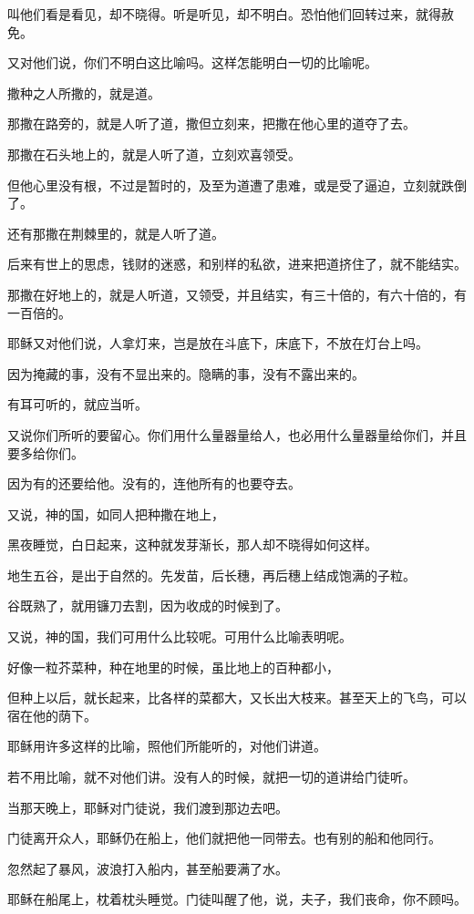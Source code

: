 \documentclass[12pt,oneside]{book}
\begin{document}
叫他们看是看见，却不晓得。听是听见，却不明白。恐怕他们回转过来，就得赦免。

又对他们说，你们不明白这比喻吗。这样怎能明白一切的比喻呢。

撒种之人所撒的，就是道。

那撒在路旁的，就是人听了道，撒但立刻来，把撒在他心里的道夺了去。

那撒在石头地上的，就是人听了道，立刻欢喜领受。

但他心里没有根，不过是暂时的，及至为道遭了患难，或是受了逼迫，立刻就跌倒了。

还有那撒在荆棘里的，就是人听了道。

后来有世上的思虑，钱财的迷惑，和别样的私欲，进来把道挤住了，就不能结实。

那撒在好地上的，就是人听道，又领受，并且结实，有三十倍的，有六十倍的，有一百倍的。

耶稣又对他们说，人拿灯来，岂是放在斗底下，床底下，不放在灯台上吗。

因为掩藏的事，没有不显出来的。隐瞒的事，没有不露出来的。

有耳可听的，就应当听。

又说你们所听的要留心。你们用什么量器量给人，也必用什么量器量给你们，并且要多给你们。

因为有的还要给他。没有的，连他所有的也要夺去。

又说，神的国，如同人把种撒在地上，

黑夜睡觉，白日起来，这种就发芽渐长，那人却不晓得如何这样。

地生五谷，是出于自然的。先发苗，后长穗，再后穗上结成饱满的子粒。

谷既熟了，就用镰刀去割，因为收成的时候到了。

又说，神的国，我们可用什么比较呢。可用什么比喻表明呢。

好像一粒芥菜种，种在地里的时候，虽比地上的百种都小，

但种上以后，就长起来，比各样的菜都大，又长出大枝来。甚至天上的飞鸟，可以宿在他的荫下。

耶稣用许多这样的比喻，照他们所能听的，对他们讲道。

若不用比喻，就不对他们讲。没有人的时候，就把一切的道讲给门徒听。

当那天晚上，耶稣对门徒说，我们渡到那边去吧。

门徒离开众人，耶稣仍在船上，他们就把他一同带去。也有别的船和他同行。

忽然起了暴风，波浪打入船内，甚至船要满了水。

耶稣在船尾上，枕着枕头睡觉。门徒叫醒了他，说，夫子，我们丧命，你不顾吗。
\end{document}
